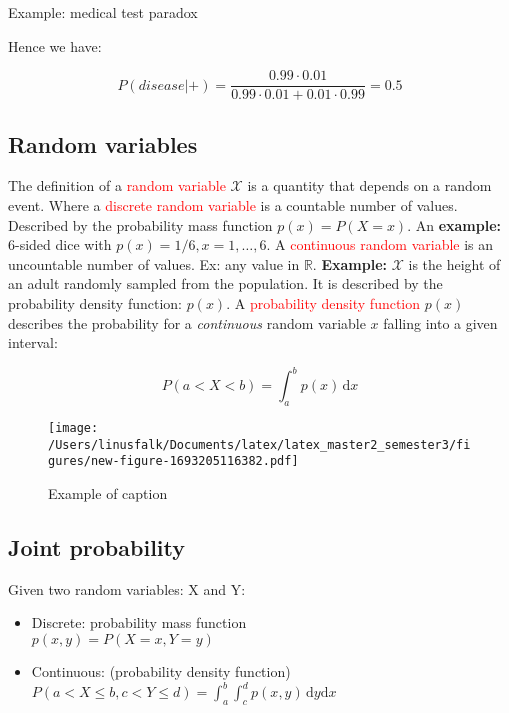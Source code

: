 \begin{example}{Example: medical test paradox}
    \vspace{2em}

    Hence we have:

    \begin{equation}
        P(disease|+) = \frac{0.99 \cdot 0.01} {0.99 \cdot 0.01 + 0.01 \cdot 0.99} = 0.5
    \end{equation}
\end{example}

\subsection{Random variables}
The definition of a \textcolor{red}{random variable} $\mathcal{X}$ is a quantity that depends on a random event. Where a
\textcolor{red}{discrete random variable} is a countable number of values. Described by the probability mass function 
$p(x) = P(X=x)$. An \textbf{example:} 6-sided dice with $p(x) = 1/6, x=1, \dots, 6$.
A \textcolor{red}{continuous random variable} is an uncountable number of values. Ex: any value in $\mathbb{R}$. \textbf{Example:} $\mathcal{X}$ is the height of an adult randomly sampled from the population.
It is described by the probability density function: $p(x)$.
\newline
A \textcolor{red}{probability density function} $p(x)$ describes the probability for a \emph{continuous} random variable $x$ falling into a given interval:

\begin{equation}
    P(a < X < b) = \int_{a}^{b} p(x)\,\text{d}x
\end{equation}

\begin{figure}[ht!]
\centering
\texttt{[image: /Users/linusfalk/Documents/latex/latex\_master2\_semester3/figures/new-figure-1693205116382.pdf]}
\caption{Example of caption}
\label{fig:example}
\end{figure}

\subsection{Joint probability}
Given two random variables: X and Y:

\begin{itemize}
    \item Discrete: probability mass function \\ 
    $p(x,y) = P(X=x, Y = y)$
    \item Continuous: (probability density function) \\
    $P(a < X \le b, c < Y \le d) = \int_{a}^{b}\int_{c}^{d} p(x,y) \,\text{d}y \text{d}x$
\end{itemize}



